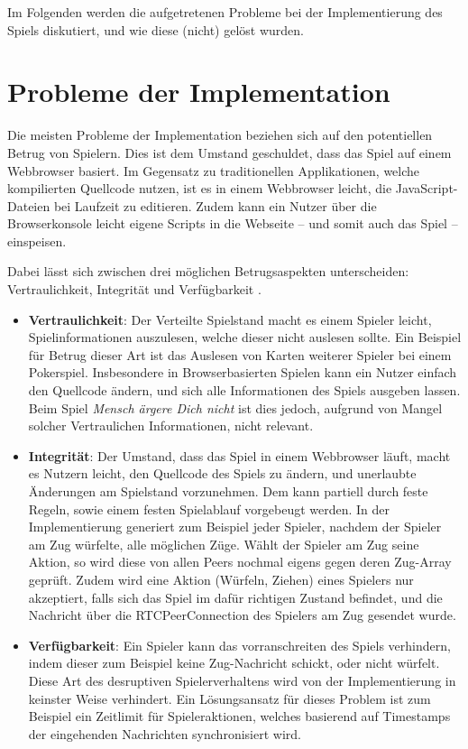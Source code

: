 Im Folgenden werden die aufgetretenen Probleme bei der Implementierung des Spiels diskutiert, und wie diese (nicht) gelöst wurden.

\section{Probleme der Implementation}
Die meisten Probleme der Implementation beziehen sich auf den potentiellen Betrug von Spielern. Dies ist dem Umstand geschuldet, dass das Spiel auf einem Webbrowser basiert. Im Gegensatz zu \glqq{}traditionellen\grqq{} Applikationen, welche kompilierten Quellcode nutzen, ist es in einem Webbrowser leicht, die JavaScript-Dateien bei Laufzeit zu editieren. Zudem kann ein Nutzer über die Browserkonsole leicht eigene Scripts in die Webseite -- und somit auch das Spiel -- einspeisen.\par

Dabei lässt sich zwischen drei möglichen Betrugsaspekten unterscheiden: Vertraulichkeit, Integrität und Verfügbarkeit \cite{p2pchallenges}.
\begin{itemize}
\item \textbf{Vertraulichkeit}: Der Verteilte Spielstand macht es einem Spieler leicht, Spielinformationen auszulesen, welche dieser nicht auslesen sollte. Ein Beispiel für Betrug dieser Art ist das Auslesen von Karten weiterer Spieler bei einem Pokerspiel. Insbesondere in Browserbasierten Spielen kann ein Nutzer einfach den Quellcode ändern, und sich alle Informationen des Spiels ausgeben lassen. Beim Spiel \textit{Mensch ärgere Dich nicht} ist dies jedoch, aufgrund von Mangel solcher Vertraulichen Informationen, nicht relevant.

\item \textbf{Integrität}: Der Umstand, dass das Spiel in einem Webbrowser läuft, macht es Nutzern leicht, den Quellcode des Spiels zu ändern, und unerlaubte Änderungen am Spielstand vorzunehmen. Dem kann partiell durch feste Regeln, sowie einem festen Spielablauf vorgebeugt werden. In der Implementierung generiert zum Beispiel jeder Spieler, nachdem der Spieler am Zug würfelte, alle möglichen Züge. Wählt der Spieler am Zug seine Aktion, so wird diese von allen Peers nochmal eigens gegen deren Zug-Array geprüft. Zudem wird eine Aktion (Würfeln, Ziehen) eines Spielers  nur akzeptiert, falls sich das Spiel im dafür richtigen Zustand befindet, und die Nachricht über die RTCPeerConnection des Spielers am Zug gesendet wurde.

\item \textbf{Verfügbarkeit}: Ein Spieler kann das vorranschreiten des Spiels verhindern, indem dieser zum Beispiel keine Zug-Nachricht schickt, oder nicht würfelt. Diese Art des desruptiven Spielerverhaltens wird von der Implementierung in keinster Weise verhindert. Ein Lösungsansatz für dieses Problem ist zum Beispiel ein Zeitlimit für Spieleraktionen, welches basierend auf Timestamps der eingehenden Nachrichten synchronisiert wird.
\end{itemize}

